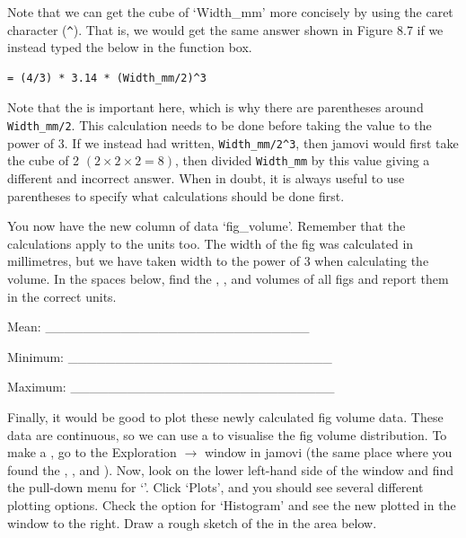 \documentclass[
  openany]{krantz}
\begin{document}
Note that we can get the cube of `Width\_mm' more concisely by using the caret character (\texttt{\^{}}).
That is, we would get the same answer shown in Figure 8.7 if we instead typed the below in the function box.

\begin{verbatim}
= (4/3) * 3.14 * (Width_mm/2)^3
\end{verbatim}

Note that the  is important here, which is why there are parentheses around \texttt{Width\_mm/2}. This calculation needs to be done before taking the value to the power of 3.
If we instead had written, \texttt{Width\_mm/2\^{}3}, then jamovi would first take the cube of 2 \((2 \times 2 \times 2 = 8)\), then divided \texttt{Width\_mm} by this value giving a different and incorrect answer.
When in doubt, it is always useful to use parentheses to specify what calculations should be done first.

You now have the new column of data `fig\_volume'.
Remember that the calculations apply to the units too.
The width of the fig was calculated in millimetres, but we have taken width to the power of 3 when calculating the volume.
In the spaces below, find the , , and  volumes of all figs and report them in the correct units.

Mean: \_\_\_\_\_\_\_\_\_\_\_\_\_\_\_\_\_\_\_\_\_\_\_\_\_\_\_\_

Minimum: \_\_\_\_\_\_\_\_\_\_\_\_\_\_\_\_\_\_\_\_\_\_\_\_\_\_\_\_

Maximum: \_\_\_\_\_\_\_\_\_\_\_\_\_\_\_\_\_\_\_\_\_\_\_\_\_\_\_\_

Finally, it would be good to plot these newly calculated fig volume data.
These data are continuous, so we can use a  to visualise the fig volume distribution.
To make a , go to the Exploration \(\to\)  window in jamovi (the same place where you found the , , and ).
Now, look on the lower left-hand side of the window and find the pull-down menu for `'.
Click `Plots', and you should see several different plotting options.
Check the option for `Histogram' and see the new  plotted in the window to the right.
Draw a rough sketch of the  in the area below.
\end{document}
